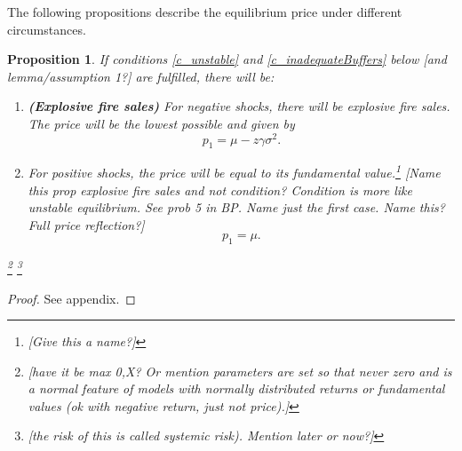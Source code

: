 \documentclass[11pt]{article}
\newtheorem{proposition}{Proposition}
\begin{document}
The following propositions describe the equilibrium price under different circumstances.

\begin{proposition} \label{p_explosiveFiresales}
If conditions \ref{c_unstable} and \ref{c_inadequateBuffers} below [and lemma/assumption 1?] are fulfilled, there will be:

\begin{enumerate}[label = \roman*)]
\item[\textnormal{i)}] \textnormal{\textbf{(Explosive fire sales)}} For negative shocks, there will be explosive fire sales. The price will be the lowest possible and given by
\begin{equation}
p_1 = \mu - z\gamma\sigma^2.
\end{equation}
\item[\textnormal{ii)}]  For positive shocks, the price will be equal to its fundamental value.\footnote{[Give this a name?]}
[Name this prop explosive fire sales and not condition? Condition is more like unstable equilibrium. See prob 5 in BP. Name just the first case. Name this? Full price reflection?]
\begin{equation}
p_1 =  \mu.
\end{equation}
\end{enumerate}


\footnote{[have it be max 0,X? Or mention parameters are set so that never zero and is a normal feature of models with normally distributed returns or fundamental values (ok with negative return, just not price).]}
\footnote{[the risk of this is called systemic risk). Mention later or now?]}
\end{proposition}
\begin{proof}
See appendix.
\end{proof}
\end{document}
